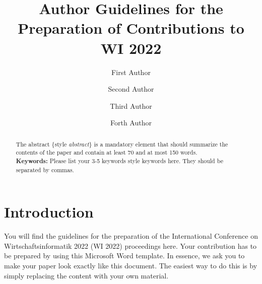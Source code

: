\documentclass{llncs}
\begin{document}
\frontmatter          %

\mainmatter              %


\title{Author Guidelines for the Preparation of Contributions to WI 2022}


\author{First Author \and
Second Author \and
Third Author \and
Forth Author}


\maketitle
\setcounter{footnote}{0}

\begin{abstract}
The abstract $\{$style \textit{abstract}$\}$ is a mandatory element that should summarize the contents of the paper and contain at least 70 and at most 150 words.\\

{\bfseries Keywords:} Please list your 3-5 keywords {style keywords} here. They should be separated by commas.
\end{abstract}

\thispagestyle{WI_footer}

\section{Introduction}
\label{sec:introduction}

You will find the guidelines for the preparation of the International Conference on Wirtschaftsinformatik 2022 (WI 2022) proceedings here. 
Your contribution has to be prepared by using this Microsoft Word template. 
In essence, we ask you to make your paper look exactly like this document. 
The easiest way to do this is by simply replacing the content with your own material.
\end{document}
